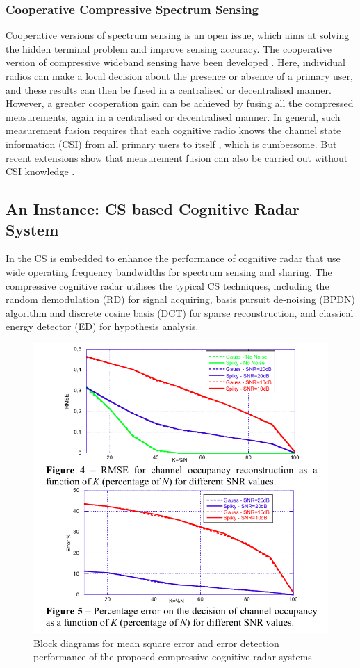 \subsubsection{Cooperative Compressive Spectrum Sensing} 
Cooperative versions of spectrum sensing is an open issue, which aims at solving the hidden terminal problem \cite{akyildiz2006next} and improve sensing accuracy. The cooperative version of compressive wideband sensing have
 been developed \cite{tian2008compressed, wang2009distributed}. Here, individual radios can make a local decision about the presence or absence of a primary user, and these results can then be fused in a centralised or decentralised manner. However, a greater cooperation gain can be achieved by fusing all the compressed measurements, again in a centralised or decentralised manner. In general, such measurement fusion requires that each cognitive radio knows the channel state information (CSI) from all primary users to itself \cite{tian2008compressed}, which is cumbersome. But recent extensions show that measurement fusion can also be carried out without CSI knowledge \cite{fanzi2011distributed}.

\subsection{An Instance: CS based Cognitive Radar System}
In \cite{stinco2014compressed} the CS is embedded to enhance the performance of cognitive radar that use wide operating frequency bandwidths for spectrum sensing and sharing. The compressive cognitive radar  utilises the typical CS techniques, including the random demodulation (RD) for signal acquiring, basis pursuit de-noising (BPDN) algorithm and discrete cosine basis (DCT) for sparse reconstruction, and classical energy detector (ED) for hypothesis analysis. 

\begin{figure}
\centering
\includegraphics[width=0.75\columnwidth]{figs/cs-cogn-radar.png}
\caption{Block diagrams for mean square error and error detection performance of the proposed compressive cognitive radar systems}
\label{cs-cogn-radar}
\end{figure} 

